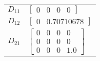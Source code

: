\begin{tabular}{cl}
 $D_{11}$ & $\left[\begin{matrix}0 & 0 & 0 & 0\end{matrix}\right]$                                                                                                                                                                                                                                                                                                                                                                                                                                                                                                                                                                      \\
 $D_{12}$ & $\left[\begin{matrix}0 & 0.70710678\end{matrix}\right]$                                                                                                                                                                                                                                                                                                                                                                                                                                                                                                                                                                     \\
 $D_{21}$ & $\left[\begin{matrix}0 & 0 & 0 & 0\\0 & 0 & 0 & 0\\0 & 0 & 0 & 1.0\end{matrix}\right]$                                                                                                                                                                                                                                                                                                                                                                                                                                                                                                                                      \\
\hline
\end{tabular}